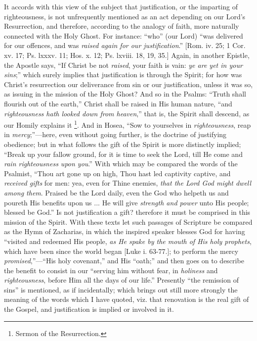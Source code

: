 It accords with this view of the subject that justification, or the
imparting of righteousness, is not unfrequently mentioned as an act
depending on our Lord's Resurrection, and therefore, according to the
analogy of faith, more naturally connected with the Holy Ghost. For
instance: ``who'' (our Lord) ``was delivered for our
offences, and was \emph{raised again for our justification}.''
[Rom. iv. 25; 1 Cor. xv. 17; Ps. lxxxv. 11; Hos. x. 12; Ps. lxviii.
18, 19, 35.] Again, in another Epistle, the Apostle says, ``If
Christ be not \emph{raised}, your faith is vain: \emph{ye are yet in your
sins};'' which surely implies that justification is through the
Spirit; for how was Christ's resurrection our deliverance from sin or
our justification, unless it was so, as issuing in the mission of the
Holy Ghost? And so in the Psalms: ``Truth shall flourish out of
the earth,'' Christ shall be raised in His human nature, ``and
\emph{righteousness hath looked down from heaven},'' that is, the
Spirit shall descend, as our Homily explains it \footnote{Sermon of the
Resurrection.}. And in Hosea, ``Sow to yourselves in \emph{righteousness},
reap in \emph{mercy};''—here, even without going further, is the
doctrine of justifying obedience; but in what follows the gift of the
Spirit is more distinctly implied; ``Break up your fallow ground,
for it is time to seek the Lord, till He come and \emph{rain
righteousness upon you}.'' With which may be compared the words
of the Psalmist, ``Thou art gone up on high, Thou hast led
captivity captive, and \emph{received gifts} for men: yea, even for
Thine enemies, \emph{that the Lord God might dwell among them}.
Praised be the Lord daily, even the God who helpeth us and
poureth His benefits upon us ... He will give \emph{strength and power}
unto His people; blessed be God.'' Is not justification a gift?
therefore it must be comprised in this mission of the Spirit. With
these texts let such passages of Scripture be compared as the Hymn of
Zacharias, in which the inspired speaker blesses God for having
``visited and redeemed His people, \emph{as He spake by the mouth of
His holy prophets}, which have been since the world began [Luke i.
63-77.]; to perform the mercy \emph{promised},''—``His holy
covenant,'' and His ``oath;'' and then goes on to describe
the benefit to consist in our ``serving him without fear, in \emph{holiness}
and \emph{righteousness}, before Him all the days of our life.''
Presently ``the remission of sins'' is mentioned, as if
incidentally; which brings out still more strongly the meaning of the
words which I have quoted, viz. that renovation is the real gift of
the Gospel, and justification is implied or involved in it.

